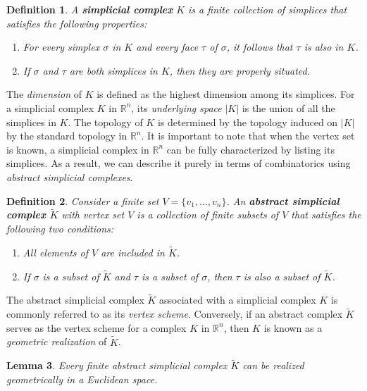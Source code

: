 \documentclass{article}
\newtheorem{definition}{Definition}[section]
\newtheorem{lemma}[definition]{Lemma}
\begin{document}
\begin{definition}
A \textbf{simplicial complex} $K$ is a finite collection of simplices that satisfies the following properties:
\begin{enumerate}
	\item For every simplex $\sigma$ in $K$ and every face $\tau$ of $\sigma$, it follows that $\tau$ is also in $K$.
	\item If $\sigma$ and $\tau$ are both simplices in $K$, then they are properly situated.
\end{enumerate}
\end{definition}

The \emph{dimension} of $K$ is defined as the highest dimension among its simplices. For a simplicial complex $K$ in $\mathbb{R}^n$, its \emph{underlying space} $\vert K \vert$ is the union of all the simplices in $K$. The topology of $K$ is determined by the topology induced on $\vert K \vert$ by the standard topology in $\mathbb{R}^n$. It is important to note that when the vertex set is known, a simplicial complex in $\mathbb{R}^n$ can be fully characterized by listing its simplices. As a result, we can describe it purely in terms of combinatorics using \emph{abstract simplicial complexes}.

\begin{definition}
Consider a finite set $V = \{v_1, \ldots, v_n\}$. An \textbf{abstract simplicial complex $\tilde{K}$} with vertex set $V$ is a collection of finite subsets of $V$ that satisfies the following two conditions:
\begin{enumerate}
	\item All elements of $V$ are included in $\tilde{K}$.
	\item If $\sigma$ is a subset of $\tilde{K}$ and $\tau$ is a subset of $\sigma$, then $\tau$ is also a subset of $\tilde{K}$.
\end{enumerate}
\end{definition}

The abstract simplicial complex $\tilde{K}$ associated with a simplicial complex $K$ is commonly referred to as its \emph{vertex scheme}. Conversely, if an abstract complex $\tilde{K}$ serves as the vertex scheme for a complex $K$ in $\mathbb{R}^n$, then $K$ is known as a \emph{geometric realization} of $\tilde{K}$.

\begin{lemma}
Every finite abstract simplicial complex $\tilde{K}$ can be realized geometrically in a Euclidean space.
\end{lemma}
\end{document}
